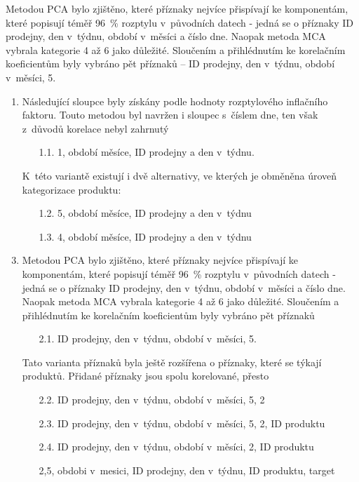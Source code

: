 Metodou PCA bylo zjištěno, které příznaky nejvíce přispívají ke komponentám, které popisují téměř 96~\% rozptylu v~původních datech - jedná se o příznaky ID prodejny, den v~týdnu, období v~měsíci a číslo dne. 
Naopak metoda MCA vybrala kategorie 4 až 6 jako důležité. Sloučením a přihlédnutím ke korelačním koeficientům byly vybráno pět příznaků -- 
    ID prodejny, den v~týdnu, období v~měsíci, 5.

\begin{enumerate}
    \item Následující sloupce byly získány podle hodnoty rozptylového inflačního faktoru. Touto metodou byl navržen i sloupec s~číslem dne, ten však z~důvodů korelace nebyl zahrnutý
    \begin{enumerate}
        \item[1.1.] 1, období měsíce, ID prodejny a den v~týdnu.
    \end{enumerate}
    
    \item[] K~této variantě existují i dvě alternativy, ve kterých je obměněna úroveň kategorizace produktu:     
    \begin{enumerate}
    \item[1.2.] 5, období měsíce, ID prodejny a den v~týdnu
    \item[1.3.] 4, období měsíce, ID prodejny a den v~týdnu
    \end{enumerate}
    \item Metodou PCA bylo zjištěno, které příznaky nejvíce přispívají ke komponentám, které popisují téměř 96~\% rozptylu v~původních datech - jedná se o příznaky ID prodejny, den v~týdnu, období v~měsíci a číslo dne. Naopak metoda MCA vybrala kategorie 4 až 6 jako důležité. Sloučením a přihlédnutím ke korelačním koeficientům byly vybráno pět příznaků
    \begin{enumerate}
        \item[2.1.] ID prodejny, den v~týdnu, období v~měsíci, 5.
    \end{enumerate}
    \item[] Tato varianta příznaků byla ještě rozšířena o příznaky, které se týkají produktů. Přidané příznaky jsou spolu korelované, přesto 
    \begin{enumerate}
    \item[2.2.] ID prodejny, den v~týdnu, období v~měsíci, 5, 2
    \item[2.3.] ID prodejny, den v~týdnu, období v~měsíci, 5, 2, ID produktu
    \item[2.4.] ID prodejny, den v~týdnu, období v~měsíci, 2, ID produktu
    \item[] 2,5, obdobi v~mesici,  ID prodejny, den v~týdnu, ID produktu, target
    \end{enumerate}
\end{enumerate}

